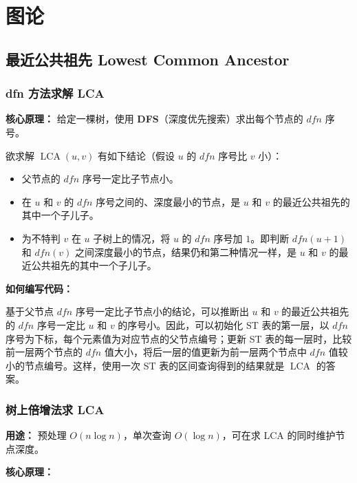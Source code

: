 \section{图论}

\subsection{最近公共祖先 Lowest Common Ancestor}

\subsubsection{dfn 方法求解 LCA}

\textbf{核心原理：} 给定一棵树，使用 \textbf{DFS}（深度优先搜索）求出每个节点的 $dfn$ 序号。

欲求解 $\operatorname{LCA}(u, v)$ 有如下结论（假设 $u$ 的 $dfn$ 序号比 $v$ 小）：

\begin{itemize}
  \item 父节点的 $dfn$ 序号一定比子节点小。
  \item 在 $u$ 和 $v$ 的 $dfn$ 序号之间的、深度最小的节点，是 $u$ 和 $v$ 的最近公共祖先的其中一个子儿子。
  \item 为不特判 $v$ 在 $u$ 子树上的情况，将 $u$ 的 $dfn$ 序号加 $1$。即判断 $dfn(u+1)$ 和 $dfn(v)$ 之间深度最小的节点，结果仍和第二种情况一样，是 $u$ 和 $v$ 的最近公共祖先的其中一个子儿子。
\end{itemize}

\textbf{如何编写代码：}

基于父节点 $dfn$ 序号一定比子节点小的结论，可以推断出 $u$ 和 $v$ 的最近公共祖先的 $dfn$ 序号一定比 $u$ 和 $v$ 的序号小。因此，可以初始化 ST 表的第一层，以 $dfn$ 序号为下标，每个元素值为对应节点的父节点编号；更新 ST 表的每一层时，比较前一层两个节点的 $dfn$ 值大小，将后一层的值更新为前一层两个节点中 $dfn$ 值较小的节点编号。这样，使用一次 ST 表的区间查询得到的结果就是 $\operatorname{LCA}$ 的答案。



\subsubsection{树上倍增法求 LCA}

\textbf{用途：} 预处理 $O(n \log n)$，单次查询 $O(\log n)$，可在求 LCA 的同时维护节点深度。

\textbf{核心原理：}

